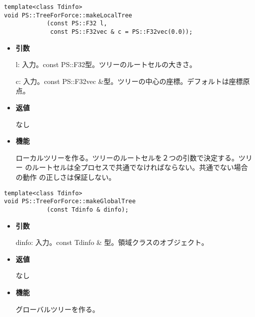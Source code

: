 \begin{screen}
\begin{verbatim}
template<class Tdinfo>
void PS::TreeForForce::makeLocalTree
            (const PS::F32 l,
             const PS::F32vec & c = PS::F32vec(0.0));
\end{verbatim}
\end{screen}

\begin{itemize}

\item {\bf 引数}

l: 入力。const PS::F32型。ツリーのルートセルの大きさ。

c: 入力。const PS::F32vec \&型。ツリーの中心の座標。デフォルトは座標原点。

\item {\bf 返値}

なし

\item {\bf 機能}

ローカルツリーを作る。ツリーのルートセルを２つの引数で決定する。ツリー
のルートセルは全プロセスで共通でなければならない。共通でない場合の動作
の正しさは保証しない。

\end{itemize}


\begin{screen}
\begin{verbatim}
template<class Tdinfo>
void PS::TreeForForce::makeGlobalTree
            (const Tdinfo & dinfo);        
\end{verbatim}
\end{screen}

\begin{itemize}

\item {\bf 引数}

dinfo: 入力。const Tdinfo \& 型。領域クラスのオブジェクト。

\item {\bf 返値}

なし

\item {\bf 機能}

グローバルツリーを作る。

\end{itemize}

